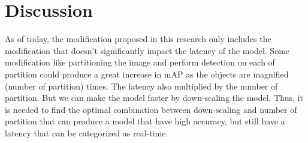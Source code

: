 \documentclass[conference]{IEEEtran}
\begin{document}
\section{Discussion}
As of today, the modification proposed in this research only includes the modification that
doesn't significantly impact the latency of the model. Some modification like partitioning
the image and perform detection on each of partition could produce a great increase in mAP
as the objects are magnified (number of partition) times. The latency also multiplied
by the number of partition. But we can make the model faster by down-scaling the model.
Thus, it is needed to find the optimal combination between down-scaling and number of partition
that can produce a model that have high accuracy, but still have a latency that can be categorized
as real-time.





\end{document}
